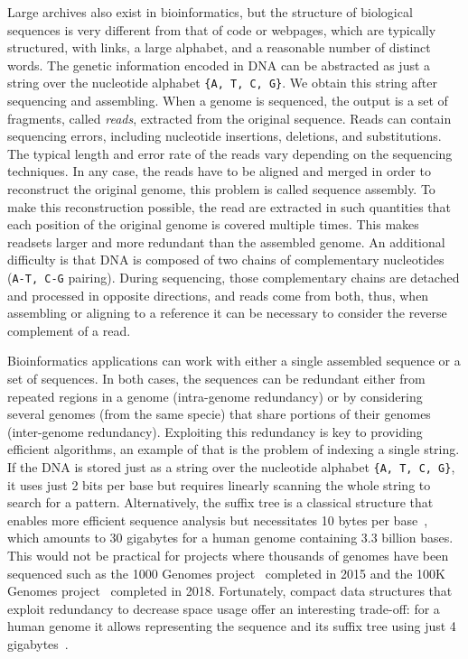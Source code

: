 Large archives also exist in bioinformatics, but the structure of biological sequences is very different from that of code or webpages, which are typically structured, with links, a large alphabet, and a reasonable number of distinct words.
The genetic information encoded in DNA can be abstracted as just a string over the nucleotide alphabet \texttt{\{A, T, C, G\}}.
We obtain this string after sequencing and assembling. When a genome is sequenced, the output is a set of fragments, called \emph{reads}, extracted from the original sequence. Reads can contain sequencing errors, including nucleotide insertions, deletions, and substitutions. The typical length and error rate of the reads vary depending on the sequencing techniques. In any case, the reads have to be aligned and merged in order to reconstruct the original genome, this problem is called sequence assembly. To make this reconstruction possible, the read are extracted in such quantities that each position of the original genome is covered multiple times. This makes readsets larger and more redundant than the assembled genome. 
An additional difficulty is that DNA is composed of two chains of complementary nucleotides (\texttt{A-T, C-G} pairing). During sequencing, those complementary chains are detached and processed in opposite directions, and reads come from both, thus, when assembling or aligning to a reference it can be necessary to consider the reverse complement of a read.


Bioinformatics applications can work with either a single assembled sequence or a set of sequences. In both cases, the sequences can be redundant either from repeated regions in a genome (intra-genome redundancy) or by considering several genomes (from the same specie) that share portions of their genomes (inter-genome redundancy).
Exploiting this redundancy is key to providing efficient algorithms, an example of that is the problem of indexing a single string.
If the DNA is stored just as a string over the nucleotide alphabet \texttt{\{A, T, C, G\}}, it uses just 2 bits per base but requires linearly scanning the whole string to search for a pattern. 
Alternatively, the suffix tree is a classical structure that enables more efficient sequence analysis but necessitates 10 bytes per base~\cite{navarro2016compact}, which amounts to 30 gigabytes for a human genome containing 3.3 billion bases. 
This would not be practical for projects where thousands of genomes have been sequenced such as the 1000 Genomes project~\cite{10002015global} completed in 2015 and the 100K Genomes project~\cite{100Kgenomes} completed in 2018. 
Fortunately, compact data structures that exploit redundancy to decrease space usage offer an interesting trade-off: for a human genome it allows representing the sequence and its suffix tree using just 4 gigabytes~\cite{navarro2016compact}.

